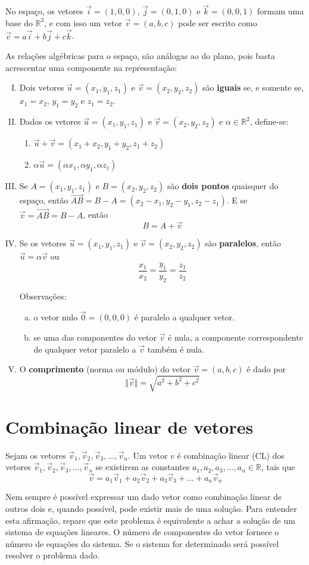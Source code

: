 No espaço, os vetores $\vec i=(1,0,0)$, $\vec j=(0,1,0)$ e $\vec k=(0,0,1)$ formam uma base do $\mathbb{R}^3$, e com isso um vetor $\vec v=(a,b,c)$ pode ser escrito como $\vec v=a\vec i+b\vec j+c\vec k$.

As relações algébricas para o espaço, são análogas ao do plano, pois basta acrescentar uma componente na representação:
\begin{enumerate}[I)]
 \item Dois vetores $\vec u=(x_1, y_1, z_1)$ e $\vec v=(x_2, y_2, z_2)$ são \textbf{iguais} se, e somente se, $x_1=x_2$, $y_1=y_2$ e $z_1=z_2$.
 \item Dados os vetores $\vec u=(x_1, y_1, z_1)$ e $\vec v=(x_2, y_2, z_2)$ e $\alpha \in \mathbb{R}^2$, define-se:
   \begin{enumerate}
     \item $\vec u +\vec v=(x_1+x_2, y_1+y_2, z_1+z_2)$
     \item $\alpha \vec u=(\alpha x_1, \alpha y_1, \alpha z_1)$
   \end{enumerate}
 \item Se $A=(x_1, y_1, z_1)$ e $B=(x_2, y_2, z_2)$ são \textbf{dois pontos} quaisquer do espaço, então $\overrightarrow{AB}=B-A=(x_2-x_1, y_2-y_1, z_2-z_1)$. E se $\vec v=\overrightarrow{AB}=B-A$, então $$B=A+\vec v$$
 \item Se os vetores $\vec u=(x_1, y_1, z_1)$ e $\vec v=(x_2, y_2, z_2)$ são \textbf{paralelos}, então $\vec u=\alpha \vec v$ ou $$\frac{x_1}{x_2}=\frac{y_1}{y_2}=\frac{z_1}{z_2}$$

Observações:
 \begin{enumerate}[a)]
  \item o vetor nulo $\vec{0}=(0, 0, 0)$ é paralelo a qualquer vetor.
  \item se uma das componentes do vetor $\vec{v}$ é nula, a componente correspondente de qualquer vetor paralelo a $\vec{v}$ também é nula.
 \end{enumerate}
 
 \item O \textbf{comprimento} (norma ou módulo) do vetor $\vec v=(a, b, c)$ é dado por $$\Vert \vec v \Vert=\sqrt{a^2+b^2+c^2}$$

\end{enumerate}

\section{Combinação linear de vetores}

Sejam os vetores $\vec v_1, \vec v_2, \vec v_3, \ldots, \vec v_n $. Um vetor $v$ é combinação linear (CL) dos vetores $\vec v_1, \vec v_2, \vec v_3, \ldots, \vec v_n $ se existirem as constantes $a_1, a_2, a_3, \ldots, a_n \in \mathbb{R}$, tais que $$\vec v=a_1\vec v_1+a_2\vec v_2+a_3\vec v_3+\ldots+a_n\vec v_n$$

Nem sempre é possível expressar um dado vetor como combinação linear de outros dois e, quando possível, pode existir mais de uma solução. Para entender esta afirmação, repare que este problema é equivalente a achar a solução de um sistema de equações lineares. O número de componentes do vetor fornece o número de equações do sistema. Se o sistema for determinado será possível resolver o problema dado.